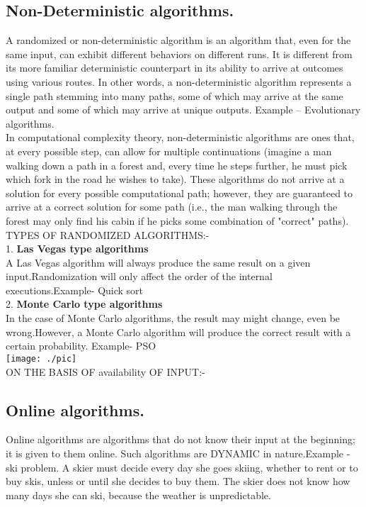 \subsection{Non-Deterministic algorithms.}A randomized or non-deterministic algorithm is an algorithm that, even for the same input, can exhibit different behaviors on different runs. It is different from its more familiar deterministic counterpart in its ability to arrive at outcomes using various routes. In other words, a non-deterministic algorithm represents a single path stemming into many paths, some of which may arrive at the same output and some of which may arrive at unique outputs.
Example – Evolutionary algorithms.\\
In computational complexity theory, non-deterministic algorithms are ones that, at every possible step, can allow for multiple continuations (imagine a man walking down a path in a forest and, every time he steps further, he must pick which fork in the road he wishes to take). These algorithms do not arrive at a solution for every possible computational path; however, they are guaranteed to arrive at a correct solution for some path (i.e., the man walking through the forest may only find his cabin if he picks some combination of "correct" paths).\\
TYPES OF RANDOMIZED ALGORITHMS:-\\
1. \textbf{Las Vegas type algorithms}\\
A Las Vegas algorithm will always produce the same result on a given input.Randomization will only affect the order of the internal executions.Example- Quick sort\\
2.\textbf{ Monte Carlo type algorithms}\\
In the case of Monte Carlo algorithms, the result may might change, even be wrong.However, a Monte Carlo algorithm will produce the correct result with a certain probability. Example- PSO\\
\texttt{[image: ./pic]}\\[1cm]
ON THE BASIS OF availability OF INPUT:-\\
\subsection{Online algorithms.}Online algorithms are algorithms that do not know their input at the beginning; it is 	given to them online. Such algorithms are DYNAMIC in nature.Example - ski problem. A skier must decide every day she goes skiing, whether to rent or to buy skis, unless or until she decides to buy them. The skier does not know how many days she can ski, because the weather is unpredictable.\\
